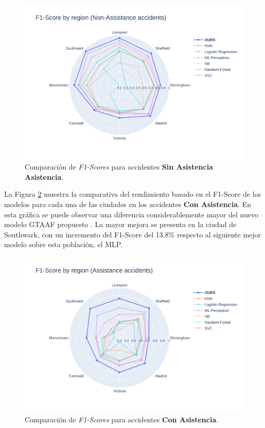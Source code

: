 \documentclass{uathesis-es}
\begin{document}
{\begin{figure}[H]
    \centering
    \includegraphics[width=150mm]{Figures/Slight.png}
    \caption{Comparación de \textit{F1-Scores} para accidentes \textbf{Sin Asistencia Asistencia}.}
    \label{GlobalSlightF1Score}
\end{figure}

La Figura \ref{GlobalAssistanceF1Score} muestra la comparativa del rendimiento basado en el F1-Score de los modelos para cada una de las ciudades en los accidentes \textbf{Con Asistencia}. En esta gráfica se puede observar una diferencia considerablemente mayor del nuevo modelo GTAAF propuesto . La mayor mejora se presenta en la ciudad de Southwark, con un incremento del F1-Score del 13.8\% respecto al siguiente mejor modelo sobre esta población, el MLP.

\begin{figure}[H]
    \centering
    \includegraphics[width=150mm]{Figures/Assistance.png}
    \caption{Comparación de \textit{F1-Scores} para accidentes \textbf{Con Asistencia}.}    \label{GlobalAssistanceF1Score}
\end{figure}

}
\end{document}
